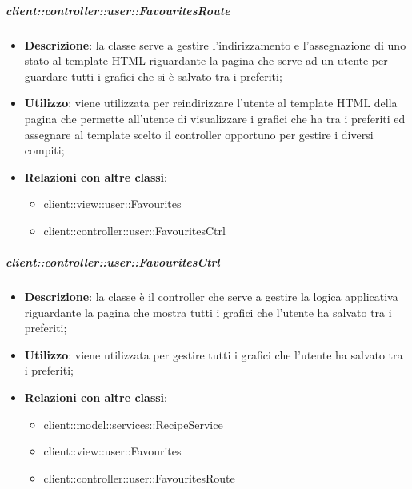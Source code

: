 		\subparagraph{client::controller::user::FavouritesRoute} %
		\label{subp:bdsm_app_client_controller_user_favouritesroute}
			\begin{itemize}
				\item \textbf{Descrizione}: la classe serve a gestire l'indirizzamento e l'assegnazione di uno stato al template HTML riguardante la pagina che serve ad un utente per guardare tutti i grafici che si è salvato tra i preferiti;
				\item \textbf{Utilizzo}: viene utilizzata per reindirizzare l'utente al template HTML della pagina che permette all'utente di visualizzare i grafici che ha tra i preferiti ed assegnare al template scelto il controller opportuno per gestire i diversi compiti;
				\item \textbf{Relazioni con altre classi}:
					\begin{itemize}
						\item client::view::user::Favourites
						\item client::controller::user::FavouritesCtrl
					\end{itemize}
			\end{itemize}


		\subparagraph{client::controller::user::FavouritesCtrl} %
		\label{subp:client_controller_user_favouritesctrl}
			\begin{itemize}
				\item \textbf{Descrizione}: la classe è il controller che serve a gestire la logica applicativa riguardante la pagina che mostra tutti i grafici che l'utente ha salvato tra i preferiti;
				\item \textbf{Utilizzo}: viene utilizzata per gestire tutti i grafici che l'utente ha salvato tra i preferiti;
				\item \textbf{Relazioni con altre classi}:
					\begin{itemize}
						\item client::model::services::RecipeService
						\item client::view::user::Favourites
						\item client::controller::user::FavouritesRoute
					\end{itemize}
			\end{itemize}

